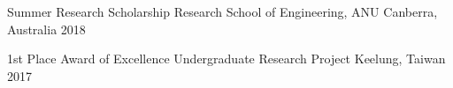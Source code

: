


\begin{cvhonors}

  \cvhonor
    {Summer Research Scholarship} %
    {Research School of Engineering, ANU} %
    {Canberra, Australia} %
    {2018} %

  \cvhonor
    {1st Place Award of Excellence} %
    {Undergraduate Research Project} %
    {Keelung, Taiwan} %
    {2017} %

\end{cvhonors}
